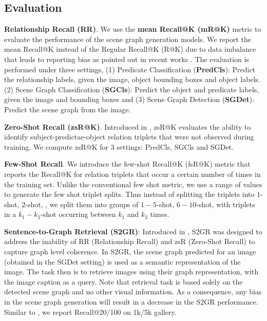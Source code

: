 \documentclass[final]{cvpr}
\begin{document}
\subsection{Evaluation}


\noindent
\textbf{Relationship Recall (RR)}. We use the \textbf{mean Recall@K (mR@K)} metric \cite{tang2019learning} to evaluate the performance of the scene graph generation models. We report the mean Recall@K instead of the Regular Recall@K (R@K) due to data imbalance that leads to reporting bias as pointed out in recent works \cite{tang2020unbiased}. The evaluation is performed under three settings, (1) Predicate Classification (\textbf{PredCls}): Predict the relationship labels, given the image, object bounding boxes and object labels. (2) Scene Graph Classification (\textbf{SGCls}): Predict the object and predicate labels, given the image and bounding boxes and (3) Scene Graph Detection (\textbf{SGDet}): Predict the scene graph from the image.

\vspace{0.05in}
\noindent
\textbf{Zero-Shot Recall (zsR@K)}. Introduced in \cite{lu2016visual}, zsR@K evaluates the ability 
to identify subject-predictae-object relation triplets that were not observed during training. We compute zsR@K for 3 settings: PredCls, SGCls and SGDet.

\vspace{0.05in}
\noindent
\textbf{Few-Shot Recall}. We introduce the few-shot Recall@K (fsR@K) metric that reports the Recall@K for relation triplets that occur a certain number of times in the training set. Unlike the conventional few shot metric, we use a range of values to generate the few shot triplet splits. Thus instead of splitting the triplets into $1$-shot, $2$-shot, \etc, we split them into groups of $1-5$-shot, $6-10$-shot, \etc with triplets in a $k_1-k_2$-shot occurring between $k_1$ and $k_2$ times. 


\vspace{0.05in}
\noindent
\textbf{Sentence-to-Graph Retrieval (S2GR)}: Introduced in \cite{tang2020unbiased}, S2GR was designed to address the inability of RR (Relationship Recall) and zsR (Zero-Shot Recall) to capture graph level coherence. In S2GR, the scene graph predicted for an image (obtained in the SGDet setting) is used as a semantic representation of the image. The task then is to retrieve images using their graph representation, with the image caption as a query. Note that retrieval task is based solely on the detected scene graph and no other visual information. As a consequence, any bias in the scene graph generation will result in a decrease in the S2GR performance.  Similar to \cite{tang2020unbiased}, we report Recall@20/100 on 1k/5k gallery.
\end{document}
